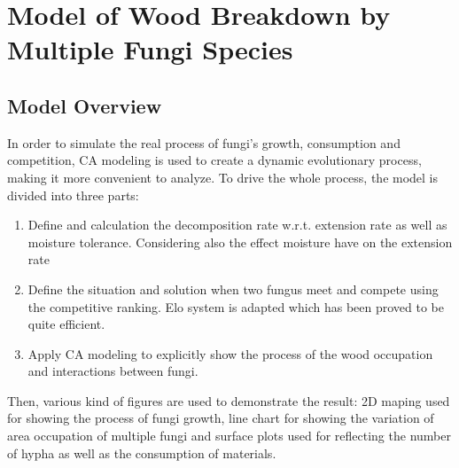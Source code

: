 \documentclass[a4paper,12pt]{article}
\begin{document}
\section{Model of Wood Breakdown by Multiple Fungi Species}

\subsection{Model Overview}
\par In order to simulate the real process of fungi's growth, consumption  and competition, CA modeling is used to create a dynamic evolutionary process, making it more convenient to analyze. To drive the whole process, the model is divided into three parts: 
\begin{enumerate}
\setlength{\itemsep}{0ex} %
\setlength{\topsep}{.1ex} %
	\item Define and calculation the decomposition rate w.r.t. extension rate as well as moisture tolerance. Considering also the effect moisture have on the extension rate
	\item Define the situation and solution when two fungus meet and compete using the competitive ranking. Elo system is adapted which has been proved to be quite efficient.
	\item Apply CA modeling to explicitly show the process of the wood occupation and interactions between fungi.
\end{enumerate}
\par Then, various kind of figures are used to demonstrate the result: 2D maping used for showing the process of fungi growth, line chart for showing the variation of area occupation of multiple fungi and surface plots used for reflecting the number of hypha as well as the consumption of materials.
\end{document}
